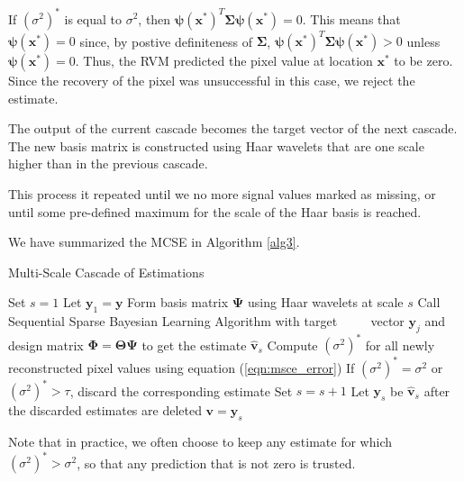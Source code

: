 If $(\sigma^2)^*$ is equal to $\sigma^2$, then $\bm\psi(\bm x^*)^T\bm\Sigma\bm\psi(\bm x^*) = 0$. 
This means that $\bm\psi(\bm x^*) = 0$ since, by postive definiteness of $\bm\Sigma$, $\bm\psi(\bm x^*)^T\bm\Sigma\bm\psi(\bm x^*) > 0$ unless $\bm\psi(\bm x^*) = 0$.
Thus, the RVM predicted the pixel value at location $\bm x^*$ to be zero. 
Since the recovery of the pixel was unsuccessful in this case, we reject the estimate.

The output of the current cascade becomes the target vector of the next cascade.
The new basis matrix is constructed using Haar wavelets that are one scale higher than in the previous cascade.

This process it repeated until we no more signal values marked as missing, or until some pre-defined maximum for the scale of the Haar basis is reached.

We have summarized the MCSE in Algorithm \ref{alg3}.

\begin{algorithm}
  \caption{Multi-Scale Cascade of Estimations \cite{pilikos2014}}
  \label{alg3}
  \begin{algorithmic}[1]
    \State Set $s=1$
    \State Let $\bm y_1 = \bm y$
    \State Form basis matrix $\bm\Psi$ using Haar wavelets at scale $s$
    \State Call Sequential Sparse Bayesian Learning Algorithm with target
    \Statex $\qquad$ vector $\bm y_j$ and design matrix $\bm\Phi=\bm\Theta\bm\Psi$ to get the estimate $\bm{\hat v}_s$
    \State Compute $(\sigma^2)^*$ for all newly reconstructed pixel values using equation (\ref{eqn:msce_error})
    \State If $(\sigma^2)^* = \sigma^2$ or $(\sigma^2)^* > \tau$, discard the corresponding estimate
    \State Set $s = s+1$
    \State Let $\bm y_s$ be $\bm{\hat v}_s$ after the discarded estimates are deleted
    \EndWhile
    \State\Return $\bm v = \bm y_s$
  \end{algorithmic}
\end{algorithm}

Note that in practice, we often choose to keep any estimate for which $(\sigma^2)^*>\sigma^2$, so that any prediction that is not zero is trusted.